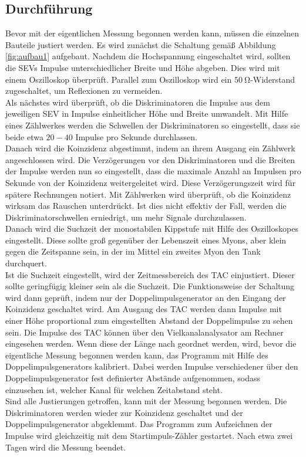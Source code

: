 \subsection{Durchführung}
\label{sec:durchführung}

Bevor mit der eigentlichen Messung begonnen werden kann, müssen die einzelnen Bauteile justiert werden.
Es wird zunächst die Schaltung gemäß Abbildung \ref{fig:aufbau1} aufgebaut.
Nachdem die Hochspannung eingeschaltet wird, sollten die SEVs Impulse unterschiedlicher Breite und Höhe abgeben.
Dies wird mit einem Oszilloskop überprüft.
Parallel zum Oszilloskop wird ein $\SI{50}{\ohm}$-Widerstand zugeschaltet, um Reflexionen zu vermeiden.\\
Als nächstes wird überprüft, ob die Diskriminatoren die Impulse aus dem jeweiligen SEV in Impulse einheitlicher Höhe und Breite umwandelt.
Mit Hilfe eines Zählwerkes werden die Schwellen der Diskriminatoren so eingestellt, dass sie beide etwa $20-40$ Impulse pro Sekunde durchlassen.\\
Danach wird die Koinzidenz abgestimmt, indem an ihrem Ausgang ein Zählwerk angeschlossen wird.
Die Verzögerungen vor den Diskriminatoren und die Breiten der Impulse werden nun so eingestellt, dass die maximale Anzahl an Impulsen pro Sekunde von der Koinzidenz weitergeleitet wird.
Diese Verzögerungszeit wird für spätere Rechnungen notiert.
Mit Zählwerken wird überprüft, ob die Koinzidenz wirksam das Rauschen unterdrückt.
Ist dies nicht effektiv der Fall, werden die Diskriminatorschwellen erniedrigt, um mehr Signale durchzulassen.\\
Danach wird die Suchzeit der monostabilen Kippstufe mit Hilfe des Oszilloskopes eingestellt.
Diese sollte groß gegenüber der Lebenszeit eines Myons, aber klein gegen die Zeitspanne sein, in der im Mittel ein zweites Myon den Tank durchquert.\\
Ist die Suchzeit eingestellt, wird der Zeitmessbereich des TAC einjustiert.
Dieser sollte geringfügig kleiner sein als die Suchzeit.
Die Funktionsweise der Schaltung wird dann geprüft, indem nur der Doppelimpulsgenerator an den Eingang der Koinzidenz geschaltet wird.
Am Ausgang des TAC werden dann Impulse mit einer Höhe proportional zum eingestellten Abstand der Doppelimpulse zu sehen sein.
Die Impulse des TAC können über den Vielkanalanalysator am Rechner eingesehen werden.
Wenn diese der Länge nach geordnet werden, wird, bevor die eigentliche Messung begonnen werden kann, das Programm mit Hilfe des Doppelimpulsgenerators kalibriert.
Dabei werden Impulse verschiedener über den Doppelimpulsgenerator fest definierter Abstände aufgenommen, sodass einzusehen ist, welcher Kanal für welchen Zeitabstand steht.\\
Sind alle Justierungen getroffen, kann mit der Messung begonnen werden.
Die Diskriminatoren werden wieder zur Koinzidenz geschaltet und der Doppelimpulsgenerator abgeklemmt.
Das Programm zum Aufzeichnen der Impulse wird gleichzeitig mit dem Startimpuls-Zähler gestartet.
Nach etwa zwei Tagen wird die Messung beendet.
